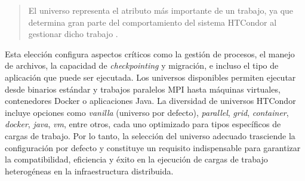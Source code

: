 \begin{quote}
	El universo representa el atributo más importante de un trabajo, ya que determina gran parte del comportamiento del sistema HTCondor al gestionar dicho trabajo \citep{HTCondor-what-is-a-job}.
\end{quote}

\noindent
Esta elección configura aspectos críticos como la gestión de procesos, el manejo de archivos, la capacidad de \textit{checkpointing} y migración, e incluso el tipo de aplicación que puede ser ejecutada. Los universos disponibles permiten ejecutar desde binarios estándar y trabajos paralelos MPI hasta máquinas virtuales, contenedores Docker o aplicaciones Java. La diversidad de universos HTCondor incluye opciones como \textit{vanilla} (universo por defecto), \textit{parallel}, \textit{grid}, \textit{container}, \textit{docker}, \textit{java}, \textit{vm}, entre otros, cada uno optimizado para tipos específicos de cargas de trabajo. Por lo tanto, la selección del universo adecuado trasciende la configuración por defecto y constituye un requisito indispensable para garantizar la compatibilidad, eficiencia y éxito en la ejecución de cargas de trabajo heterogéneas en la infraestructura distribuida.
